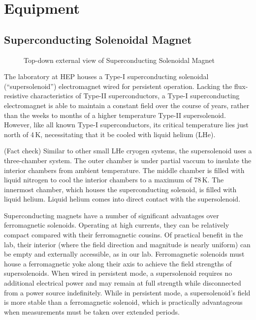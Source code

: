 \part{Equipment}

\chapter{Superconducting Solenoidal Magnet}
\label{chap:eq_magnet}

\begin{figure}[htbp]
  \centering
  
  \caption{Top-down external view of Superconducting Solenoidal Magnet}
  \label{fig:eq_magnet:topdown}
\end{figure}



The laboratory at HEP houses a Type-I superconducting solenoidal (``supersolenoid'') electromagnet wired for persistent operation.  Lacking the flux-resistive characteristics of Type-II superconductors, a Type-I superconducting electromagnet is able to maintain a constant field over the course of years, rather than the weeks to months of a higher temperature Type-II supersolenoid.  However, like all known Type-I superconductors, its critical temperature lies just north of 4\,K, necessitating that it be cooled with liquid helium (LHe).

\FIXME{} (Fact check) Similar to other small LHe cryogen systems, the supersolenoid uses a three-chamber system.  The outer chamber is under partial vaccum to insulate the interior chambers from ambient temperature.  The middle chamber is filled with liquid nitrogen to cool the interior chambers to a maximum of 78\,K.  The innermost chamber, which houses the superconducting solenoid, is filled with liquid helium.  Liquid helium comes into direct contact with the supersolenoid.

Superconducting magnets have a number of significant advantages over ferromagnetic solenoids.  Operating at high currents, they can be relatively compact compared with their ferromagnetic cousins.  Of practical benefit in the lab, their interior (where the field direction and magnitude is nearly uniform) can be empty and externally accessible, as in our lab.  Ferromagnetic solenoids must house a ferromagnetic yoke along their axis to achieve the field strengths of supersolenoids.  When wired in persistent mode, a supersolenoid requires no additional electrical power and may remain at full strength while disconnected from a power source indefinitely.  While in persistent mode, a supersolenoid's field is more stable than a ferromagnetic solenoid, which is practically advantageous when measurements must be taken over extended periods.


